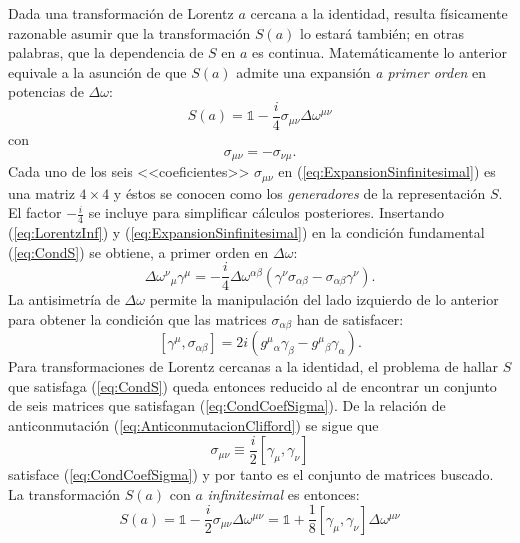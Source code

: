 Dada una transformación de Lorentz $a$ cercana a la identidad, resulta físicamente razonable asumir que la transformación $S(a)$ lo estará también; en otras palabras, que la dependencia de $S$ en $a$ es continua. Matemáticamente lo anterior equivale  a la asunción de que $S(a)$ admite una expansión \textit{a primer orden} en potencias de $\Delta \omega$:
\begin{equation}\label{eq:ExpansionSinfinitesimal}
S(a)=\mathbb{1}-\frac{i}{4}\sigma_{\mu \nu}\Delta \omega^{\mu \nu}
\end{equation}
con $$\sigma_{\mu \nu}=-\sigma_{\nu \mu}.$$
Cada uno de los seis <<coeficientes>> $\sigma_{\mu \nu}$ en (\ref{eq:ExpansionSinfinitesimal}) es una matriz $4\times 4$ y éstos se conocen como los \textit{generadores} de la representación $S$. El factor $-\frac{i}{4}$ se incluye para simplificar cálculos posteriores. Insertando (\ref{eq:LorentzInf}) y (\ref{eq:ExpansionSinfinitesimal}) en la condición fundamental (\ref{eq:CondS}) se obtiene, a primer orden en $\Delta \omega$:
\begin{equation*}
\Delta \omega^{\nu}{}_{\mu}\gamma^{\mu}=-\frac{i}{4}\Delta \omega^{\alpha \beta}(\gamma^\nu \sigma_{\alpha \beta}-\sigma_{\alpha \beta}\gamma^{\nu}).
\end{equation*}
La antisimetría de $\Delta \omega$ permite la manipulación del lado izquierdo de lo anterior para obtener la condición que las matrices $\sigma_{\alpha \beta}$ han de satisfacer:
\begin{equation}\label{eq:CondCoefSigma}
\left[ \gamma^\mu ,\sigma_{\alpha\beta}\right]=2i(g^{\mu}{}_{\alpha}\gamma_{\beta}-g^{\mu}{}_{\beta}\gamma_{\alpha}).
\end{equation}
Para transformaciones de Lorentz cercanas a la identidad, el problema de hallar $S$ que satisfaga (\ref{eq:CondS}) queda entonces reducido al de encontrar un conjunto de seis matrices que satisfagan (\ref{eq:CondCoefSigma}). De la relación de anticonmutación (\ref{eq:AnticonmutacionClifford}) se sigue que 
\begin{equation}\label{eq:DefSigma}
\sigma_{\mu \nu}\equiv \frac{i}{2}\left[\gamma_\mu,\gamma_\nu \right]
\end{equation}
satisface (\ref{eq:CondCoefSigma}) y por tanto es el conjunto de matrices buscado. La transformación $S(a)$ con $a$ \textit{infinitesimal} es entonces:
\begin{equation}\label{eq:Sinfinitesimal}
S(a)=\mathbb{1}-\frac{i}{2}\sigma_{\mu \nu}\Delta \omega^{\mu \nu}=\mathbb{1}+\frac{1}{8}\left[\gamma_\mu,\gamma_\nu \right]\Delta \omega^{\mu \nu}
\end{equation}

